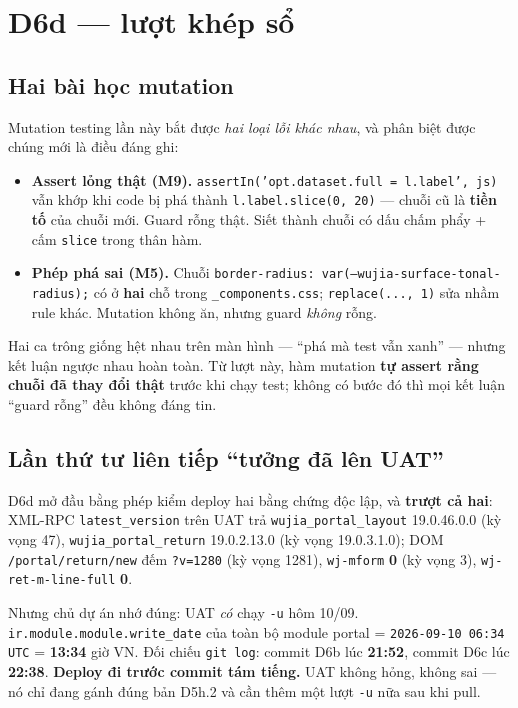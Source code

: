 \section{D6d --- lượt khép sổ}

\subsection*{Hai bài học mutation}

Mutation testing lần này bắt được \emph{hai loại lỗi khác nhau}, và phân biệt được chúng mới là
điều đáng ghi:

\begin{itemize}
\item \textbf{Assert lỏng thật (M9).} \texttt{assertIn('opt.dataset.full = l.label', js)} vẫn khớp
  khi code bị phá thành \texttt{l.label.slice(0, 20)} --- chuỗi cũ là \textbf{tiền tố} của chuỗi
  mới. Guard rỗng thật. Siết thành chuỗi có dấu chấm phẩy + cấm \texttt{slice} trong thân hàm.
\item \textbf{Phép phá sai (M5).} Chuỗi \texttt{border-radius: var(--wujia-surface-tonal-radius);}
  có ở \textbf{hai} chỗ trong \texttt{\_components.css}; \texttt{replace(..., 1)} sửa nhầm rule
  khác. Mutation không ăn, nhưng guard \emph{không} rỗng.
\end{itemize}

Hai ca trông giống hệt nhau trên màn hình --- ``phá mà test vẫn xanh'' --- nhưng kết luận ngược
nhau hoàn toàn. Từ lượt này, hàm mutation \textbf{tự assert rằng chuỗi đã thay đổi thật} trước khi
chạy test; không có bước đó thì mọi kết luận ``guard rỗng'' đều không đáng tin.

\subsection*{Lần thứ tư liên tiếp ``tưởng đã lên UAT''}

D6d mở đầu bằng phép kiểm deploy hai bằng chứng độc lập, và \textbf{trượt cả hai}: XML-RPC
\texttt{latest\_version} trên UAT trả \texttt{wujia\_portal\_layout} 19.0.46.0.0 (kỳ vọng 47),
\texttt{wujia\_portal\_return} 19.0.2.13.0 (kỳ vọng 19.0.3.1.0); DOM \texttt{/portal/return/new}
đếm \texttt{?v=1280} (kỳ vọng 1281), \texttt{wj-mform} \textbf{0} (kỳ vọng 3),
\texttt{wj-ret-m-line-full} \textbf{0}.

Nhưng chủ dự án nhớ đúng: UAT \emph{có} chạy \texttt{-u} hôm 10/09.
\texttt{ir.module.module.write\_date} của toàn bộ module portal = \texttt{2026-09-10 06:34 UTC} =
\textbf{13:34} giờ VN. Đối chiếu \texttt{git log}: commit D6b lúc \textbf{21:52}, commit D6c lúc
\textbf{22:38}. \textbf{Deploy đi trước commit tám tiếng.} UAT không hỏng, không sai --- nó chỉ
đang gánh đúng bản D5h.2 và cần thêm một lượt \texttt{-u} nữa sau khi pull.

